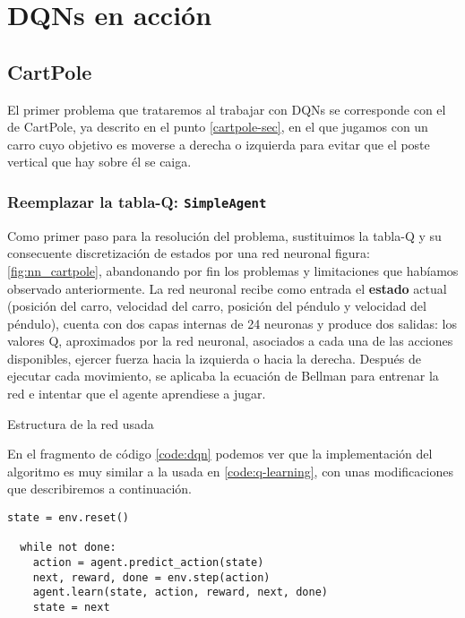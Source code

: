\chapter{DQNs en acción}
\label{cap:dqnEnAccion}



\section{CartPole}
\label{sec:cartpoleDQN}

El primer problema que trataremos al trabajar con DQNs se corresponde con el de CartPole, ya descrito en el punto \ref{cartpole-sec}, en el que jugamos con un carro cuyo objetivo es moverse a derecha o izquierda para evitar que el poste vertical que hay sobre él se caiga.


\subsection{Reemplazar la tabla-Q: \texttt{SimpleAgent}}

Como primer paso para la resolución del problema, sustituimos la tabla-Q y su consecuente discretización de estados por una red neuronal figura:\ref{fig:nn_cartpole}, abandonando por fin los problemas y limitaciones que habíamos observado anteriormente. La red neuronal recibe como entrada el \textbf{estado} actual (posición del carro, velocidad del carro, posición del péndulo y velocidad del péndulo), cuenta con dos capas internas de 24 neuronas y produce dos salidas: los valores Q, aproximados por la red neuronal, asociados a cada una de las acciones disponibles, ejercer fuerza hacia la izquierda o hacia la derecha. Después de ejecutar cada movimiento, se aplicaba la ecuación de Bellman para entrenar la red e intentar que el agente aprendiese a jugar.

%
       {Estructura de la red usada}

En el fragmento de código \ref{code:dqn} podemos ver que la implementación del algoritmo es muy similar a la usada en \ref{code:q-learning}, con unas modificaciones que describiremos a continuación.

\begin{minipage}{0.9\linewidth}%
\begin{lstlisting}[frame=tb, caption=Pseudocódigo SimpleAgent, inputencoding=latin1, label=code:dqn]      
  state = env.reset()

  while not done:
    action = agent.predict_action(state)
    next, reward, done = env.step(action)
    agent.learn(state, action, reward, next, done)
    state = next
        
\end{lstlisting}%
\end{minipage}

